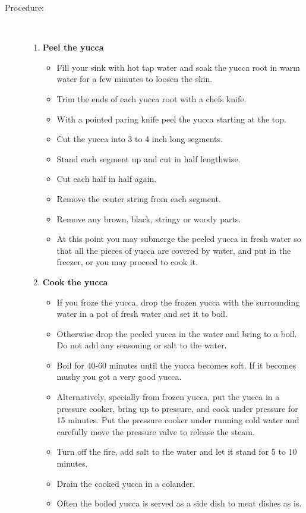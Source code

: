 \documentclass[11pt,letterpaper]{article}
\begin{document}
\begin{description}
\item[Procedure:]\ \\
	\begin{enumerate}
	\item {\bf Peel the yucca}
	\begin{itemize}
	\item Fill your sink with hot tap water and soak the yucca root in warm water for a few minutes to loosen the skin.
	\item Trim the ends of each yucca root with a chefs knife.
        \item With a pointed paring knife peel the yucca starting at the top. 
	\item Cut the yucca into 3 to 4 inch long segments.
	\item Stand each segment up and cut in half lengthwise.
	\item Cut each half in half again.
	\item Remove the center string from each segment.
	\item Remove any brown, black, stringy or woody parts.
	\item At this point you may submerge the peeled yucca in fresh water so that all the pieces of yucca are covered by water, and put in the freezer, or you may proceed to cook it.
	\end{itemize}
	\item {\bf Cook the yucca}
	\begin{itemize}
	\item If you froze the yucca, drop the frozen yucca with the surrounding water in a pot of fresh water and set it to boil.
	\item Otherwise drop the peeled yucca in the water and bring to a boil. Do not add any seasoning or salt to the water.
	\item Boil for 40-60 minutes until the yucca becomes soft. If it becomes mushy you got a very good yucca. 
	\item Alternatively, specially from frozen yucca, put the yucca in a pressure cooker, bring up to pressure, and cook under pressure for 15 minutes. Put the pressure cooker under running cold water and carefully move the pressure valve to release the steam.
	\item Turn off the fire, add salt to the water and let it stand for 5 to 10 minutes.
	\item Drain the cooked yucca in a colander.
	\item Often the boiled yucca is served as a side dish to meat dishes as is. 

\end{itemize}
\end{enumerate}
\end{description}
\end{document}
